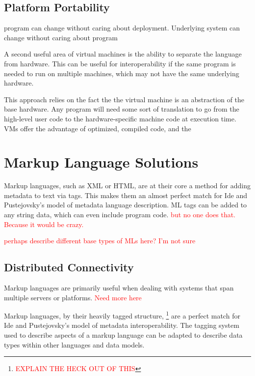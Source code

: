 \documentclass{sig-alternate}
\newcommand{\mycomment}[1]{\textcolor{red}{#1}}
\begin{document}
\subsection*{Platform Portability}
program can change without caring about deployment. Underlying system can change without caring about program

A second useful area of virtual machines is the ability to separate the language from hardware. This can be useful for interoperability if the same program is needed to run on multiple machines, which may not have the same underlying hardware.

This approach relies on the fact the the virtual machine is an abstraction of the base hardware. Any program will need some sort of translation to go from the high-level user code to the hardware-specific machine code at execution time. VMs offer the advantage of optimized, compiled code, and the 


\section{Markup Language Solutions}\label{ML}
Markup languages, such as XML or HTML, are at their core a method for adding metadata to text via tags. This makes them an almost perfect match for Ide and Pustejovsky's model of metadata language description. ML tags can be added to any string data, which can even include program code. \mycomment{but no one does that. Because it would be crazy.}

\mycomment{perhaps describe different base types of MLs here? I'm not sure}

\subsection*{Distributed Connectivity}
Markup languages are primarily useful when dealing with systems that span multiple servers or platforms. \mycomment{Need more here}

Markup languages, by their heavily tagged structure, \footnote{\mycomment{EXPLAIN THE HECK OUT OF THIS}} are a perfect match for Ide and Pustejovsky's model of metadata interoperability.\cite{Ide:2010} The tagging system used to describe aspects of a markup language can be adapted to describe data types within other languages and data models.
\end{document}
